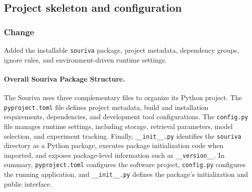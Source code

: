 

\subsection{Project skeleton and configuration}



\subsubsection{Change}

Added the installable \texttt{souriva} package, project metadata, dependency groups, ignore rules, and environment-driven runtime settings.

\paragraph{Overall Souriva Package Structure.}
The Souriva uses three complementary files to organize its Python project.
The \texttt{pyproject.toml} file defines project metadata, build and
installation requirements, dependencies, and development tool configurations.
The \texttt{config.py} file manages runtime settings, including storage,
retrieval parameters, model selection, and experiment tracking.
Finally, \texttt{\_\_init\_\_.py} identifies the \texttt{souriva}
directory as a Python package, executes package initialization code when
imported, and exposes package-level information such as
\texttt{\_\_version\_\_}. In summary, \texttt{pyproject.toml}
configures the software project, \texttt{config.py} configures the
running application, and \texttt{\_\_init\_\_.py} defines the
package's initialization and public interface.

